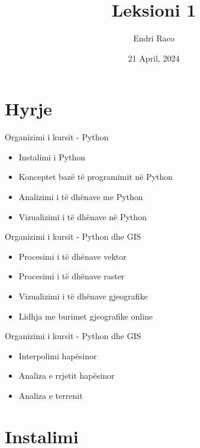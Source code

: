 \documentclass[
  ignorenonframetext,
]{beamer}
\title{Leksioni 1}
\author{Endri Raco}
\date{21 April, 2024}
\begin{document}
\frame{\titlepage}

\begin{frame}[allowframebreaks]
  \tableofcontents[hideallsubsections]
\end{frame}
\hypertarget{hyrje}{%
\section*{Hyrje}\label{hyrje}}

\begin{frame}{Organizimi i kursit - Python}
\protect\hypertarget{organizimi-i-kursit---python}{}
\begin{itemize}
\item
  Instalimi i Python
\item
  Konceptet bazë të programimit në Python
\item
  Analizimi i të dhënave me Python
\item
  Vizualizimi i të dhënave në Python
\end{itemize}
\end{frame}

\begin{frame}{Organizimi i kursit - Python dhe GIS}
\protect\hypertarget{organizimi-i-kursit---python-dhe-gis}{}
\begin{itemize}
\item
  Procesimi i të dhënave vektor
\item
  Procesimi i të dhënave raster
\item
  Vizualizimi i të dhënave gjeografike
\item
  Lidhja me burimet gjeografike online
\end{itemize}
\end{frame}

\begin{frame}{Organizimi i kursit - Python dhe GIS}
\protect\hypertarget{organizimi-i-kursit---python-dhe-gis-1}{}
\begin{itemize}
\item
  Interpolimi hapësinor
\item
  Analiza e rrjetit hapësinor
\item
  Analiza e terrenit
\end{itemize}
\end{frame}

\hypertarget{instalimi}{%
\section*{Instalimi}\label{instalimi}}
\end{document}
